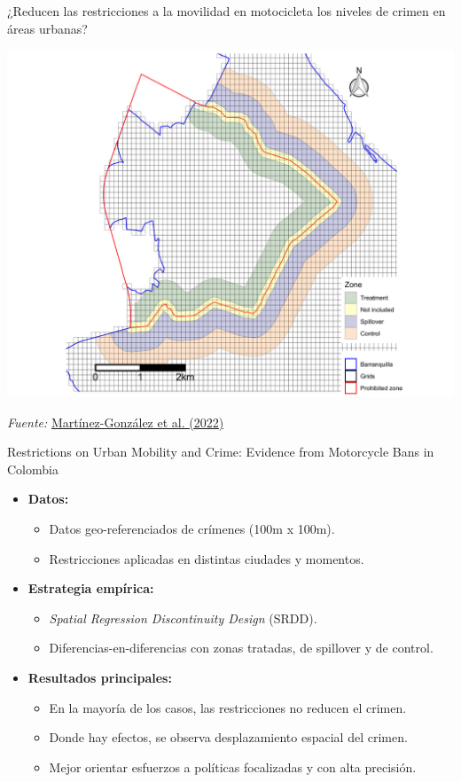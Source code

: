 \documentclass{beamer}
\begin{document}
\begin{frame}{¿Reducen las restricciones a la movilidad en motocicleta los niveles de crimen en áreas urbanas?}
\begin{center}
\includegraphics[scale=0.08]{figures/paper_motos}
\end{center}
\textit{Fuente:} \href{https://papers.ssrn.com/sol3/papers.cfm?abstract_id=4072147}{Martínez-González et al. (2022)}
\end{frame}

\begin{frame}{Restrictions on Urban Mobility and Crime: Evidence from Motorcycle Bans in Colombia}
\begin{itemize}
    \item \textbf{Datos:}
    \begin{itemize}
        \item Datos geo-referenciados de crímenes (100m x 100m).
        \item Restricciones aplicadas en distintas ciudades y momentos.
    \end{itemize}
    \item \textbf{Estrategia empírica:}
    \begin{itemize}
        \item \textit{Spatial Regression Discontinuity Design} (SRDD).
        \item Diferencias-en-diferencias con zonas tratadas, de spillover y de control.
    \end{itemize}
    \item \textbf{Resultados principales:}
    \begin{itemize}
        \item En la mayoría de los casos, las restricciones no reducen el crimen.
        \item Donde hay efectos, se observa desplazamiento espacial del crimen.
        \item Mejor orientar esfuerzos a políticas focalizadas y con alta precisión.
    \end{itemize}
\end{itemize}
\end{frame}
\end{document}
